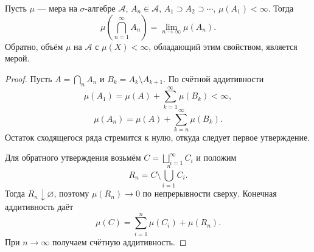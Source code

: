 \label{ticket:20}

\begin{theorem}
Пусть $\mu$ --- мера на $\sigma$-алгебре $\mathcal A$, $A_n\in\mathcal A$, $A_1\supset A_2\supset\cdots$, $\mu(A_1)<\infty$.
Тогда
\[
  \mu\left(\bigcap_{n=1}^{\infty}A_n\right)
  =\lim_{n\to\infty}\mu(A_n).
\]
Обратно, объём $\mu$ на $\mathcal A$ с $\mu(X)<\infty$, обладающий этим свойством, является мерой.
\end{theorem}

\begin{proof}
Пусть $A=\bigcap_n A_n$ и $B_k=A_k\setminus A_{k+1}$.
По счётной аддитивности
\[
  \mu(A_1)=\mu(A)+\sum_{k=1}^{\infty}\mu(B_k)<\infty,
\]
\[
  \mu(A_n)=\mu(A)+\sum_{k=n}^{\infty}\mu(B_k).
\]
Остаток сходящегося ряда стремится к нулю, откуда следует первое утверждение.

Для обратного утверждения возьмём $C=\bigsqcup_{i=1}^{\infty}C_i$ и положим
\[
  R_n=C\setminus\bigcup_{i=1}^n C_i.
\]
Тогда $R_n\downarrow\varnothing$, поэтому $\mu(R_n)\to0$ по непрерывности сверху.
Конечная аддитивность даёт
\[
  \mu(C)=\sum_{i=1}^n\mu(C_i)+\mu(R_n).
\]
При $n\to\infty$ получаем счётную аддитивность.
\end{proof}
